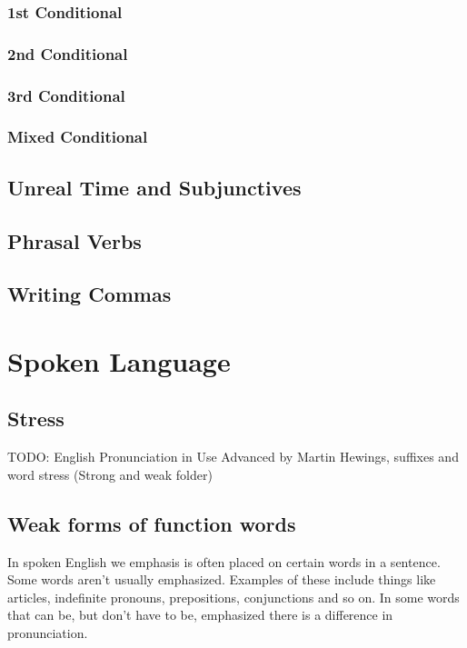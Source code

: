 \documentclass[a4paper,12pt]{report}
\begin{document}
\subsection{1st Conditional}

\subsection{2nd Conditional}

\subsection{3rd Conditional}

\subsection{Mixed Conditional}



\section{Unreal Time and Subjunctives}

\section{Phrasal Verbs}

\section{Writing Commas}

\chapter{Spoken Language}

\section{Stress}

TODO: English Pronunciation in Use Advanced by Martin Hewings, suffixes and word stress (Strong and weak folder)

\section{Weak forms of function words}

In spoken English we emphasis is often placed on certain words in a sentence.
Some words aren't usually emphasized. Examples of these include things like articles, indefinite pronouns, prepositions, conjunctions and so on.
In some words that can be, but don't have to be, emphasized there is a difference in pronunciation.
\end{document}
